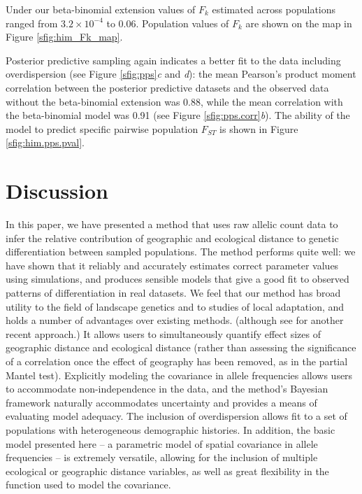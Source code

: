Under our beta-binomial extension values of $F_{k}$ estimated across populations ranged from $3.2 \times10^{-4}$ to 0.06.  Population values of $F_{k}$ are shown on the map in Figure \ref{sfig:him_Fk_map}. 

Posterior predictive sampling again indicates a better fit to the data including overdispersion (see Figure \ref{sfig:pps}\textit{c} and \textit{d}): the mean Pearson's product moment correlation between the posterior predictive datasets and the observed data without the beta-binomial extension was 0.88, while the mean correlation with the beta-binomial model was 0.91 (see Figure \ref{sfig:pps.corr}\textit{b}).  The ability of the model to predict specific pairwise population $F_{ST}$ is shown in Figure \ref{sfig:him.pps.pval}.  

\section*{Discussion}

In this paper, we have presented a method that uses raw allelic count data to infer the relative contribution of geographic and ecological distance to genetic differentiation between sampled populations. 
The method performs quite well: we have shown that it reliably and accurately estimates correct parameter values using simulations, and produces sensible models that give a good fit to observed patterns of differentiation in real datasets.
We feel that our method has broad utility to the field of landscape genetics and to studies of local adaptation, and holds a number of advantages over existing methods.  
(although see \citet{Wang2012} for another recent approach.)
It allows users to simultaneously quantify effect sizes of geographic distance and ecological distance (rather than assessing the significance of a correlation once the effect of geography has been removed, as in the partial Mantel test).  Explicitly modeling the covariance in allele frequencies allows users to accommodate non-independence in the data, and the method's Bayesian framework naturally accommodates uncertainty and provides a means of evaluating model adequacy.  
The inclusion of overdispersion allows fit to a set of populations with heterogeneous demographic histories.
In addition, the basic model presented here -- a parametric model of spatial covariance in allele frequencies -- is extremely versatile, allowing for the inclusion of multiple ecological or geographic distance variables, as well as great flexibility in the function used to model the covariance.  


